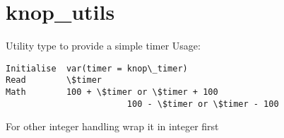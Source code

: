 \documentclass[letterpaper,10pt,english]{sphinxmanual}
\begin{document}
\chapter{knop\_utils}
\label{knop_utils:knop-utils}\label{knop_utils::doc}

\begin{fulllineitems}
\label{knop_utils:knop_timer}
Utility type to provide a simple timer
Usage:

\begin{Verbatim}[commandchars=\\\{\}]
Initialise  var(timer = knop\_timer)
Read        \$timer
Math        100 + \$timer or \$timer + 100
                        100 - \$timer or \$timer - 100
\end{Verbatim}

For other integer handling wrap it in integer first


\begin{fulllineitems}
\end{fulllineitems}



\begin{fulllineitems}
\end{fulllineitems}


\begin{fulllineitems}
\label{knop_utils:knop_timer.asstring}
\end{fulllineitems}


\begin{fulllineitems}
\label{knop_utils:knop_timer.micros}
\end{fulllineitems}



\begin{fulllineitems}
\end{fulllineitems}


\begin{fulllineitems}
\label{knop_utils:knop_timer.oncreate}
\end{fulllineitems}


\end{fulllineitems}
\end{document}
